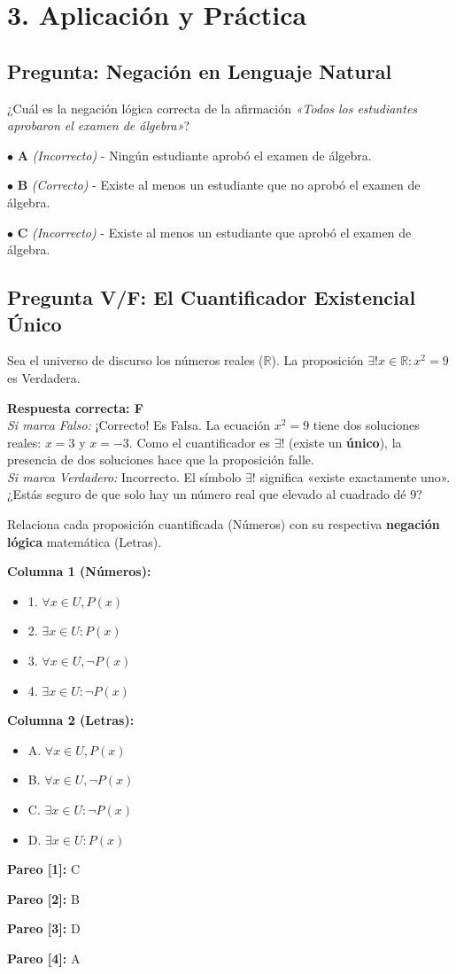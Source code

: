 \documentclass[11pt]{article}
\newenvironment{aplicacion}{\section*{3. Aplicación y Práctica}}{}
\newenvironment{preguntaalternativas}[1]{\subsection*{Pregunta: #1}\par\vspace{0.1cm}}{\vspace{0.3cm}}
\newcommand{\opcion}[3]{\par\noindent $\bullet$ \textbf{#1} \textit{(#2)} - #3\par\vspace{0.15cm}}
\newenvironment{preguntaverdaderofalso}[1]{\subsection*{Pregunta V/F: #1}\par\vspace{0.1cm}}{\vspace{0.3cm}}
\newcommand{\verdaderofalso}[3]{\par\noindent\textbf{Respuesta correcta: #1} \\ \textit{Si marca Falso:} #2 \\ \textit{Si marca Verdadero:} #3\par\vspace{0.15cm}}
\newenvironment{pareadosdoscolumnas}[1]{\begin{tcolorbox}[colback=violet!5,colframe=violet!75!black,title=Términos Pareados (2 Columnas): #1]}{\end{tcolorbox}}
\newcommand{\columnaI}[1]{\par\medskip\textbf{Columna 1 (Números):}\par\begin{itemize}#1\end{itemize}}
\newcommand{\columnaII}[1]{\par\medskip\textbf{Columna 2 (Letras):}\par\begin{itemize}#1\end{itemize}}
\newcommand{\pareo}[2]{\par\smallskip\textbf{Pareo [#1]:} #2\par}
\begin{document}
\begin{aplicacion}
  \begin{preguntaalternativas}{Negación en Lenguaje Natural}
    ¿Cuál es la negación lógica correcta de la afirmación \textit{«Todos los estudiantes aprobaron el examen de álgebra»}?
    
    \opcion{A}{Incorrecto}{Ningún estudiante aprobó el examen de álgebra.}
    \opcion{B}{Correcto}{Existe al menos un estudiante que no aprobó el examen de álgebra.}
    \opcion{C}{Incorrecto}{Existe al menos un estudiante que aprobó el examen de álgebra.}
  \end{preguntaalternativas}

  \begin{preguntaverdaderofalso}{El Cuantificador Existencial Único}
    Sea el universo de discurso los números reales ($\mathbb{R}$). La proposición $\exists! x \in \mathbb{R} : x^2 = 9$ es Verdadera.
    \verdaderofalso{F}
      {¡Correcto! Es Falsa. La ecuación $x^2 = 9$ tiene dos soluciones reales: $x = 3$ y $x = -3$. Como el cuantificador es $\exists!$ (existe un \textbf{único}), la presencia de dos soluciones hace que la proposición falle.}
      {Incorrecto. El símbolo $\exists!$ significa «existe exactamente uno». ¿Estás seguro de que solo hay un número real que elevado al cuadrado dé 9?}
  \end{preguntaverdaderofalso}

  \begin{pareadosdoscolumnas}{Leyes de De Morgan Generalizadas}
    Relaciona cada proposición cuantificada (Números) con su respectiva \textbf{negación lógica} matemática (Letras).
    \columnaI{
      \item 1. $\forall x \in U, P(x)$
      \item 2. $\exists x \in U : P(x)$
      \item 3. $\forall x \in U, \neg P(x)$
      \item 4. $\exists x \in U : \neg P(x)$
    }
    \columnaII{
      \item A. $\forall x \in U, P(x)$
      \item B. $\forall x \in U, \neg P(x)$
      \item C. $\exists x \in U : \neg P(x)$
      \item D. $\exists x \in U : P(x)$
    }
    
    \pareo{1}{C}
    \pareo{2}{B}
    \pareo{3}{D}
    \pareo{4}{A}
  \end{pareadosdoscolumnas}

\end{aplicacion}
\end{document}
